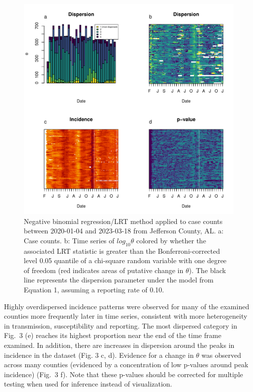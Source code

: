\documentclass[10pt,letterpaper]{article}
\begin{document}
\begin{figure}[!h]
\includegraphics[width=1\textwidth]{fig2.pdf}
\caption{Negative binomial regression/LRT method applied to case counts between 2020-01-04 and 2023-03-18 from Jefferson County, AL. a: Case counts. b: Time series of $log_{10}\theta$ colored by whether the associated LRT statistic is greater than the Bonferroni-corrected level 0.05 quantile of a chi-square random variable with one degree of freedom (red indicates areas of putative change in $\theta$). The black line represents the dispersion parameter under the model from Equation 1, assuming a reporting rate of 0.10.
}
\label{fig2}
\end{figure}

Highly overdispersed incidence patterns were observed for many of the examined counties more frequently later in time series, consistent with more heterogeneity in transmission, susceptibility and reporting. 
The most dispersed category in Fig.\ 3 (e) reaches its highest proportion near the end of the time frame examined.
In addition, there are increases in dispersion around the peaks in incidence in the dataset (Fig. 3 c, d).
Evidence for a change in \begin{math}\theta\end{math} was observed across many counties (evidenced by a concentration of low p-values around peak incidence) (Fig.\ 3 f). Note that these p-values should be corrected for multiple testing when used for inference instead of visualization.
\end{document}

